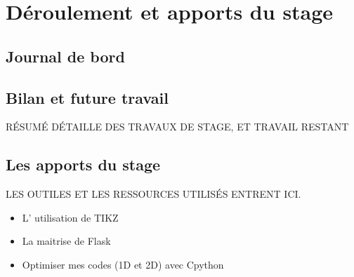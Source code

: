 
\chapter{Déroulement et apports du stage} %

\label{Chapter5} %







\section{Journal de bord}












\section{Bilan et future travail}

RÉSUMÉ DÉTAILLE DES TRAVAUX DE STAGE, ET TRAVAIL RESTANT














\section{Les apports du stage}

LES OUTILES ET LES RESSOURCES UTILISÉS ENTRENT ICI.





\begin{itemize}
   \item L' utilisation de TIKZ
   \item La maitrise de Flask
\end{itemize}

\begin{itemize}
    \item Optimiser mes codes (1D et 2D) avec Cpython
\end{itemize}


